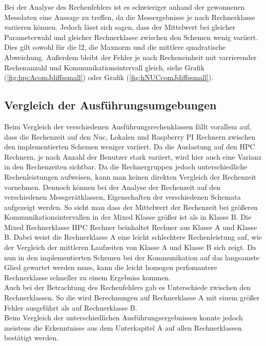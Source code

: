 Bei der Analyse des Rechenfehlers ist es schwieriger anhand der gewonnenen Messdaten eine Aussage zu treffen, da die Messergebnisse je nach Rechnerklasse variieren k\"onnen.  Jedoch l\"asst sich sagen, dass der Mittelwert bei gleicher Parameterwahl und gleicher Rechnerklasse zwischen den Schemen wenig variiert. Dies gilt sowohl f\"ur die l2, die Maxnorm und die mittlere quadratische Abweichung. Au\ss{}erdem bleibt der Fehler je nach Recheneinheit mit varrierender Rechenanzahl und Kommunikationsintervall gleich, siehe Grafik (\ref{fig:hpcAcomJdiffssmall}) oder Grafik (\ref{fig:hNUCcomJdiffssmall}).\\

\subsection{Vergleich der Ausf\"uhrungsumgebungen}
Beim Vergleich der verschiedenen Ausf\"uhrungsrechenklassen f\"allt vorallem auf, dass die Rechenzeit auf den Nuc, Lokalen und Raspberry PI Rechnern zwischen den implementierten Schemen weniger variiert. Da die Auslastung auf den HPC Rechnern, je nach Anzahl der Benutzer stark variiert, wird hier auch eine Varianz in den Rechenzeiten sichtbar. Da die Rechnergruppen jedoch unterschiedliche Rechenleistungen aufweisen, kann man keinen direkten Vergleich der Rechenzeit vornehmen. Dennoch k\"onnen bei der Analyse der Rechenzeit auf den verschiedenen Messger\"atklassen, Eigenschaften der verschiedenen Schemata aufgezeigt werden. So sieht man dass der Mittelwert der Rechenzeit bei gr\"o\ss{}eren Kommunikationsintervallen in der Mixed Klasse gr\"o\ss{}er ist als in Klasse B. Die Mixed Rechnerklasse HPC Rechner beinhaltet Rechner aus Klasse A und Klasse B. Dabei weist die Rechnerklasse A eine leicht schlechtere Rechenleistung auf, wie der Vergleich der mittleren Laufzeiten von Klasse A und Klasse B sich zeigt. Da nun in den implementierten Schemen bei der Kommunikation auf das langsamste Glied gewartet werden muss, kann die leicht homogen perfomantere Rechnerklasse schneller zu einem Ergebniss kommen.\\
Auch bei der Betrachtung des Rechenfehlers gab es Unterschiede zwischen den Rechnerklassen. So die wird Berechnungen auf Rechnerklasse A mit einem gr\"o\ss{}er Fehler ausgef\"uhrt als auf Rechnerklasse B. \\
Beim Vergleich der unterschiedlichen Ausf\"uhrungsergebnissen konnte jedoch meistens die Erkenntnisse aus dem Unterkapitel A auf allen Rechnerklassen best\"atigt werden. 

